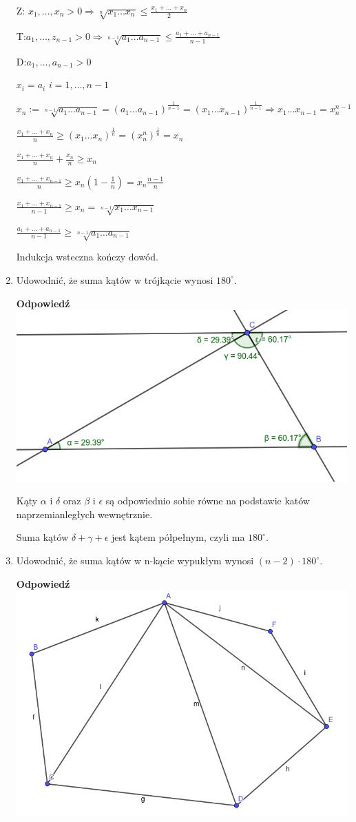 \documentclass[12pt,a4paper]{article}
\theoremstyle{break}
\newcommand{\Odp}[1]{
		\begin{mdframed}[style=zadanie]
			\textbf{Odpowiedź}\\
			#1
		\end{mdframed}
	}
\begin{document}
\begin{enumerate}[1.]
{\begin{enumerate}[I)]
			Z: $x_1,\dots,x_n>0 \Rightarrow \sqrt[n]{x_1\dots x_n}\leq \frac{x_1+\dots+x_n}{2}$
			
			T:$a_1,\dots,z_{n-1}>0 \Rightarrow \sqrt[n-1]{a_1\dots a_{n-1}}\leq \frac{a_1+\dots+a_{n-1}}{n-1}$
				
			D:$a_1,\dots,a_{n-1}>0$
			
			$x_i=a_i$ $i=1,\dots,n-1$
			
			$x_n:=\sqrt[n-1]{a_1\dots a_{n-1}}=(a_1\dots a_{n-1})^\frac{1}{n-1}=(x_1\dots x_{n-1})^\frac{1}{n-1}\Rightarrow x_1\dots x_{n-1}=x_n^{n-1}$
			
			$\frac{x_1+\dots+x_n}{n}\geq (x_1\dots x_n)^\frac{1}{n}=(x_n^n)^{\frac{1}{n}}=x_n$
			
			$\frac{x_1+\dots+x_n}{n}+\frac{x_n}{n}\geq x_n$
			
			$\frac{x_1+\dots+x_{n-1}}{n}\geq x_n(1-\frac{1}{n})=x_n\frac{n-1}{n}$
			
			$\frac{x_1+\dots+x_{n-1}}{n-1}\geq x_n = \sqrt[n-1]{x_1\dots x_{n-1}}$
			
			$\frac{a_1+\dots+a_{n-1}}{n-1}\geq\sqrt[n-1]{a_1\dots a_{n-1}}$
			
			Indukcja wsteczna kończy dowód.
		\end{enumerate}
	}
	
	\item Udowodnić, że suma kątów w trójkącie wynosi $180^\circ$.
	\Odp{
		\includegraphics[width=0.7\linewidth]{tr180.jpeg}
		
		Kąty $\alpha$ i $\delta$ oraz $\beta$ i $\epsilon$ są odpowiednio sobie równe na podstawie katów naprzemianległych wewnętrznie.
		
		Suma kątów $\delta + \gamma + \epsilon$ jest kątem półpełnym, czyli ma $180^\circ$.
	}
	
	\item Udowodnić, że suma kątów w n-kącie wypukłym wynosi $(n - 2) \cdot 180^\circ$.
	\Odp{
		\includegraphics[width=0.7\linewidth]{wielo180.jpeg}
		
}
\end{enumerate}
\end{document}
